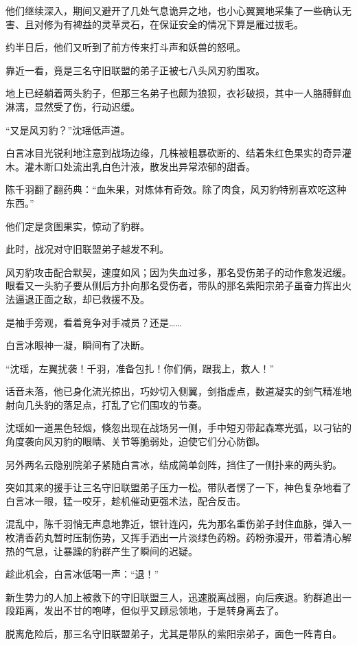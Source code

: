 他们继续深入，期间又避开了几处气息诡异之地，也小心翼翼地采集了一些确认无害、且对修为有裨益的灵草灵石，在保证安全的情况下算是雁过拔毛。

约半日后，他们又听到了前方传来打斗声和妖兽的怒吼。

靠近一看，竟是三名守旧联盟的弟子正被七八头风刃豹围攻。

地上已经躺着两头豹子，但那三名弟子也颇为狼狈，衣衫破损，其中一人胳膊鲜血淋漓，显然受了伤，行动迟缓。

“又是风刃豹？”沈瑶低声道。

白言冰目光锐利地注意到战场边缘，几株被粗暴砍断的、结着朱红色果实的奇异灌木。灌木断口处流出乳白色汁液，散发出异常浓郁的甜香。

陈千羽翻了翻药典：“血朱果，对炼体有奇效。除了肉食，风刃豹特别喜欢吃这种东西。”

他们定是贪图果实，惊动了豹群。

此时，战况对守旧联盟弟子越发不利。

风刃豹攻击配合默契，速度如风；因为失血过多，那名受伤弟子的动作愈发迟缓。眼看又一头豹子要从侧后方扑向那名受伤者，带队的那名紫阳宗弟子虽奋力挥出火法逼退正面之敌，却已救援不及。

是袖手旁观，看着竞争对手减员？还是……

白言冰眼神一凝，瞬间有了决断。

“沈瑶，左翼扰袭！千羽，准备包扎！你们俩，跟我上，救人！”

话音未落，他已身化流光掠出，巧妙切入侧翼，剑指虚点，数道凝实的剑气精准地射向几头豹的落足点，打乱了它们围攻的节奏。

沈瑶如一道黑色轻烟，倏忽出现在战场另一侧，手中短刃带起森寒光弧，以刁钻的角度袭向风刃豹的眼睛、关节等脆弱处，迫使它们分心防御。

另外两名云隐别院弟子紧随白言冰，结成简单剑阵，挡住了一侧扑来的两头豹。

突如其来的援手让三名守旧联盟弟子压力一松。带队者愣了一下，神色复杂地看了白言冰一眼，猛一咬牙，趁机催动更强术法，配合反击。

混乱中，陈千羽悄无声息地靠近，银针连闪，先为那名重伤弟子封住血脉，弹入一枚清香药丸暂时压制伤势，又挥手洒出一片淡绿色药粉。药粉弥漫开，带着清心解热的气息，让暴躁的豹群产生了瞬间的迟疑。

趁此机会，白言冰低喝一声：“退！”

新生势力的人加上被救下的守旧联盟三人，迅速脱离战圈，向后疾退。豹群追出一段距离，发出不甘的咆哮，但似乎又顾忌领地，于是转身离去了。

脱离危险后，那三名守旧联盟弟子，尤其是带队的紫阳宗弟子，面色一阵青白。

